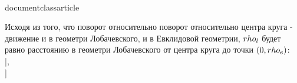 \\documentclass{article}
\begin{document}
Исходя из того, что поворот относительно поворот относительно центра круга - движение и в геометри Лобачевского, и в Евклидовой геометрии, $\\rho_l$ будет равно расстоянию в геометри Лобачевского от центра круга до точки $(0, \\rho_e)$:
\\[\\rho_l = |ln[0, \\rho_e; -1, 1]|,\\]
\\[\\rho_l = |ln(\\frac{\\rho_e - 1}{0 - 1}:\\frac{\\rho_e + 1}{0 + 1})|,\\]
\\[\\rho_l = |ln(\\frac{1 - \\rho_e}{1 + \\rho_e})|,\\]
\\[\\frac{1 - \\rho_e}{1 + \\rho_e} = e^{-\\rho_l},\\]
\\[\\rho_e = \\frac{1 - e^{-\\rho_l}}{1 + e^{-\\rho_l}},\\]
\\[\\rho_e = \\frac{1 - e^{-arch(\\frac{cos(\\frac{\\pi}{P})cos(\\frac{\\pi}{Q})}{sin(\\frac{\\pi}{P})sin(\\frac{\\pi}{Q})})}}{1 + e^{-arch(\\frac{cos(\\frac{\\pi}{P})cos(\\frac{\\pi}{Q})}{sin(\\frac{\\pi}{P})sin(\\frac{\\pi}{Q})})}}\\]
\end{document}
